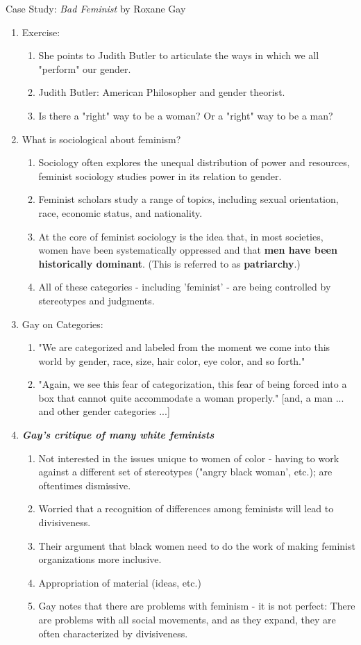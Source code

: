 \documentclass[12pt,a4paper]{article}
\begin{document}
\begin{eg}{Case Study: \textit{Bad Feminist} by Roxane Gay}
\begin{enumerate}
		\item Exercise: 
		\begin{enumerate}
			\item She points to Judith Butler to articulate the ways in which we all "perform" our gender. 
			\item Judith Butler: American Philosopher and gender theorist.
			\item Is there a "right" way to be a woman? Or a "right" way to be a man? 
		\end{enumerate}
		\item What is sociological about feminism? 
		\begin{enumerate}
			\item Sociology often explores the unequal distribution of power and resources, feminist sociology studies power in its relation to gender. 
			\item Feminist scholars study a range of topics, including sexual orientation, race, economic status, and nationality. 
			\item At the core of feminist sociology is the idea that, in most societies, women have been systematically oppressed and that \textbf{men have been historically dominant}. (This is referred to as \textbf{patriarchy}.)
			\item All of these categories - including 'feminist' - are being controlled by stereotypes and judgments. 
		\end{enumerate}
		\item Gay on Categories: 
		\begin{enumerate}
			\item "We are categorized and labeled from the moment we come into this world by gender, race, size, hair color, eye color, and so forth."
			\item "Again, we see this fear of categorization, this fear of being forced into a box that cannot quite accommodate a woman properly." [and, a man ... and other gender categories ...]
		\end{enumerate}
		\item \textit{\textbf{Gay's critique of many white feminists }}
		\begin{enumerate}
			\item Not interested in the issues unique to women of color - having to work against a different set of stereotypes ("angry black woman', etc.); are oftentimes dismissive. 
			\item Worried that a recognition of differences among feminists will lead to divisiveness.
			\item Their argument that black women need to do the work of making feminist organizations more inclusive.
			\item Appropriation of material (ideas, etc.)
			\item Gay notes that there are problems with feminism - it is not perfect: There are problems with all social movements, and as they expand, they are often characterized by divisiveness. 
		\end{enumerate}
	\end{enumerate}
\end{eg}
\end{document}
